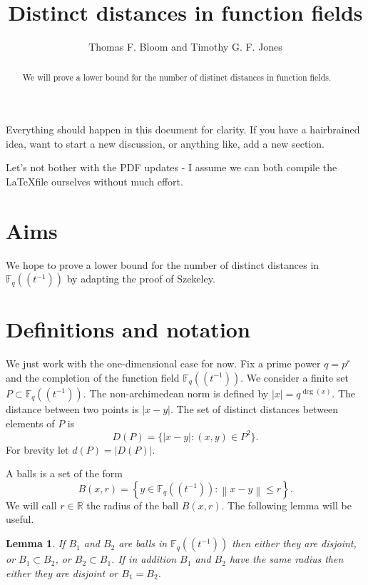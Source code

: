 \documentclass{amsart}
\newcommand{\abs}[1]{\left\lvert #1\right\rvert}
\newcommand{\norm}[1]{\left\lVert #1\right\rVert}
\newcommand{\ffield}{\mathbb{F}_q(\!(t^{-1})\!)}
\newtheorem{lemma}[theorem]{Lemma}
\begin{document}
\title{Distinct distances in function fields}

\author{Thomas F. Bloom and Timothy G. F. Jones}

\begin{abstract}
We will prove a lower bound for the number of distinct distances in function fields.
\end{abstract}  

\maketitle
\tableofcontents

Everything should happen in this document for clarity. If you have a hairbrained idea, want to start a new discussion, or anything like, add a new section. 

Let's not bother with the PDF updates - I assume we can both compile the \LaTeX file ourselves without much effort.

\section{Aims}
We hope to prove a lower bound for the number of distinct distances in $\ffield$ by adapting the proof of Szekeley.

\section{Definitions and notation}
We just work with the one-dimensional case for now. Fix a prime power $q=p^r$ and the completion of the function field $\ffield$. We consider a finite set $P\subset\ffield$. The non-archimedean norm is defined by $\abs{x}=q^{\deg(x)}$. The distance between two points is $\abs{x-y}$. The set of distinct distances between elements of $P$ is
\[D(P)=\{ \abs{x-y} : (x,y)\in P^2\}.\]
For brevity let $d(P)=\abs{D(P)}$. 

A balls is a set of the form
  \[B(x,r)=\left\{y \in \ffield : \norm{x-y}\leq r\right\}.\]
We will call $r\in\mathbb{R}$ the radius of the ball $B(x,r)$. The following lemma will be useful.

\begin{lemma}\label{theorem:nonarchball}
If $B_1$ and $B_2$ are balls in $\ffield$ then either they are disjoint, or $B_1 \subset B_2$, or $B_2 \subset B_1$. If in addition $B_1$ and $B_2$ have the same radius then either they are disjoint or $B_1=B_2$.
\end{lemma}
\end{document}
